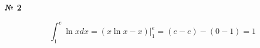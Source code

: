 \documentclass{article}
\begin{document}
\textbf{№ 2} 

$$ \int_{1}^{e} \ln{x} dx 
= \left( x\ln{x}-x \right) \bigg\vert_{1}^{e} 
= (e-e) - (0-1)
= 1 $$
\end{document}
